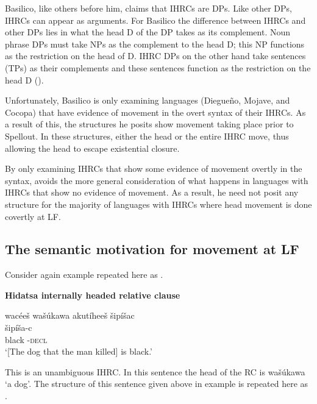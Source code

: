 \documentclass[output=paper]{LSP/langsci}
\begin{document}
Basilico, like others before him, claims that IHRCs are DPs. Like other DPs, IHRCs can appear as arguments. For Basilico the difference between IHRCs and other DPs lies in what the head D of the DP takes as its complement. Noun phrase DPs must take NPs as the complement to the head D; this NP functions as the restriction on the head of D. IHRC DPs on the other hand take sentences (TPs) as their complements and these sentences function as the restriction on the head D (\citealt{Basilico1996}). 
	
Unfortunately, Basilico is only examining languages (Diegue\~no, Mojave, and Cocopa) that have evidence of movement in the overt syntax of their IHRCs. As a result of this, the structures he posits show movement taking place prior to Spellout. In these structures, either the head or the entire IHRC move, thus allowing the head to escape existential closure.   
	
By only examining IHRCs that show some evidence of movement overtly in the syntax, \citeauthor{Basilico1996} avoids the more general consideration of what happens in languages with IHRCs that show no evidence of movement. As a result, he need not posit any structure for the majority of languages with IHRCs where head movement is done covertly at LF.  

\subsection{The semantic motivation for movement at LF}\label{sec:boyle:6.4}

Consider again example  repeated here as .

\ea \textbf{Hidatsa internally headed relative clause} \label{boyle46}

\glll {\ob}wac\'ee\v{s} wa\v{s}\'ukawa akut\'ihee\v{s}{\cb} \v{s}ip\'i\v{s}ac\\
[wac\'ee-\v{s}   wa\v{s}\'uka-wa  aku-t\'i-hee-\v{s}]  \v{s}ip\'i\v{s}a-c\\
[man-\textsc{det.d} dog-\textsc{det.i}  \textsc{rel.s}-die-\textsc{3.caus.d.sg}-\textsc{det.d}] black -\textsc{decl}\\
\trans `[The dog that the man killed] is black.' 
\z

This is an unambiguous IHRC. In this sentence the head of the RC is wa\v{s}\'ukawa `a dog'. The structure of this sentence given above in example  is repeated here as . 

\ea 	\label{boyle47}
{\hspace{1em}}\newline
\end{document}
